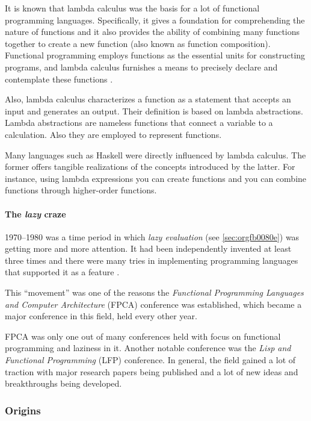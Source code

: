 \documentclass[a4paper, titlepage, twoside]{article}
\begin{document}
It is known that lambda calculus was the basis for a lot of functional programming languages. Specifically, it gives a foundation for comprehending the nature of functions and it also provides the ability of combining many functions together to create a new function (also known as function composition). Functional programming employs functions as the essential units for constructing programs, and lambda calculus furnishes a means to precisely declare and contemplate these functions \autocite{pandaquestsRelationshipLambdaCalculus2023}.

Also, lambda calculus characterizes a function as a statement that accepts an input and generates an output. Their definition is based on lambda abstractions. Lambda abstractions are nameless functions that connect a variable to a calculation. Also they are employed to represent functions. 

Many languages such as Haskell were directly influenced by lambda calculus. The former offers tangible realizations of the concepts introduced by the latter. For instance, using lambda expressions you can create functions and you can combine functions through higher-order functions.

\paragraph*{The \emph{lazy} craze}
\label{sec:orgf75dbff}

1970--1980 was a time period in which \emph{lazy evaluation} (see \ref{sec:orgfb0080e}) was getting more and more attention. It had been independently invented at least three times and there were many tries in implementing programming languages that supported it as a feature \autocite{hudakHistoryHaskellBeing2007}.

This ``movement'' was one of the reasons the \emph{Functional Programming Languages and Computer Architecture} (FPCA) conference was established, which became a major conference in this field, held every other year.

FPCA was only one out of many conferences held with focus on functional programming and laziness in it. Another notable conference was the \emph{Lisp and Functional Programming} (LFP) conference. In general, the field gained a lot of traction with major research papers being published and a lot of new ideas and breakthroughs being developed.

\subsubsection{Origins}
\label{sec:org3e10a7b}
\end{document}

